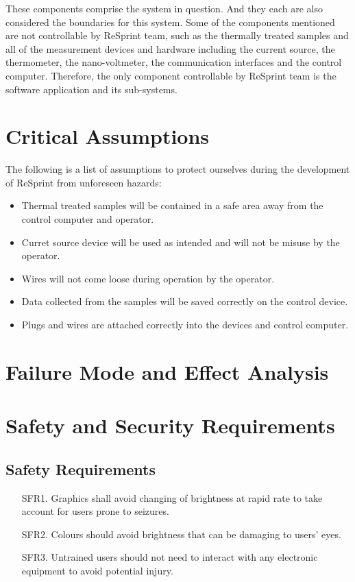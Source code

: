 \documentclass{article}
\begin{document}
\noindent These components comprise the system in question. And they each are also considered the boundaries for this system. Some of the components mentioned are not controllable by ReSprint team, such as the thermally treated samples and all of the measurement devices and hardware including the current source, the thermometer, the nano-voltmeter, the communication interfaces and the control computer. Therefore, the only component controllable by ReSprint team is the software application and its sub-systems.

\section{Critical Assumptions}

\noindent The following is a list of assumptions to protect ourselves during the development of ReSprint from unforeseen hazards:

\begin{itemize}
  \item Thermal treated samples will be contained in a safe area away from the control computer and operator. 
  \item Curret source device will be used as intended and will not be misuse by the operator.
  \item Wires will not come loose during operation by the operator.
  \item Data collected from the samples will be saved correctly on the control device.
  \item Plugs and wires are attached correctly into the devices and control computer.
\end{itemize}

\section{Failure Mode and Effect Analysis}


\section{Safety and Security Requirements}

\subsection*{Safety Requirements}
\begin{enumerate}
  \item[SFR1.] Graphics shall avoid changing of brightness at rapid rate to take account for users prone to seizures.
  \item[SFR2.] Colours should avoid brightness that can be damaging to users' eyes.
  \item[SFR3.] Untrained users should not need to interact with any electronic equipment to avoid potential injury.\\
\end{enumerate}
\end{document}

